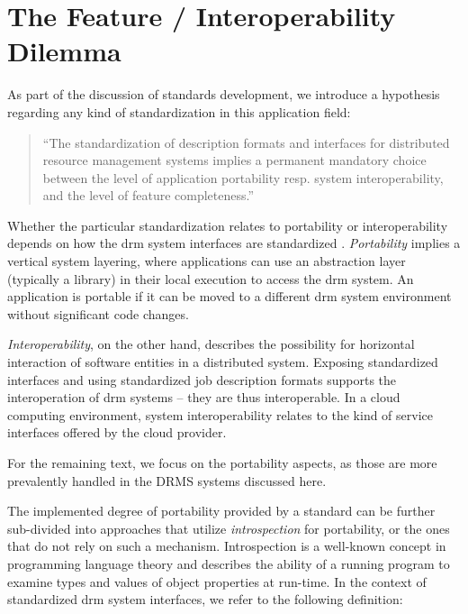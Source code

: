 \documentclass[twocolumn]{svjour3}       %
\begin{document}
\section{The Feature / Interoperability Dilemma}
\label{sec:hypothesis}

As part of the discussion of standards development, we introduce a hypothesis regarding any kind of standardization in this application field:

\begin{quote}
``The standardization of description formats and interfaces for distributed resource management systems implies a permanent mandatory choice between the level of application portability resp. system interoperability, and the level of feature completeness.''
\end{quote}

Whether the particular standardization relates to portability or interoperability depends on how the \gls{drm} system interfaces are standardized \cite{citemaster_9638}. \emph{Portability} implies a vertical system layering, where applications can use an abstraction layer (typically a library) in their local execution to access the \gls{drm} system. An application is portable if it can be moved to a different \gls{drm} system environment without significant code changes. 

\emph{Interoperability}, on the other hand, describes the possibility for horizontal interaction of software entities in a distributed system.  Exposing standardized interfaces and using standardized job description formats supports the interoperation of \gls{drm} systems -- they are thus interoperable.  In a cloud computing environment, system interoperability relates to the kind of service interfaces offered by the cloud provider.


For the remaining text, we focus on the portability aspects, as those are more prevalently handled in the DRMS systems discussed here.

The implemented degree of portability provided by a standard can be further sub-divided into approaches that utilize \emph{introspection} for portability, or the ones that do not rely on such a mechanism. Introspection is a well-known concept in programming language theory and describes the ability of a running program to examine types and values of object properties at run-time. In the context of standardized \gls{drm} system interfaces, we refer to the following definition:
\end{document}
